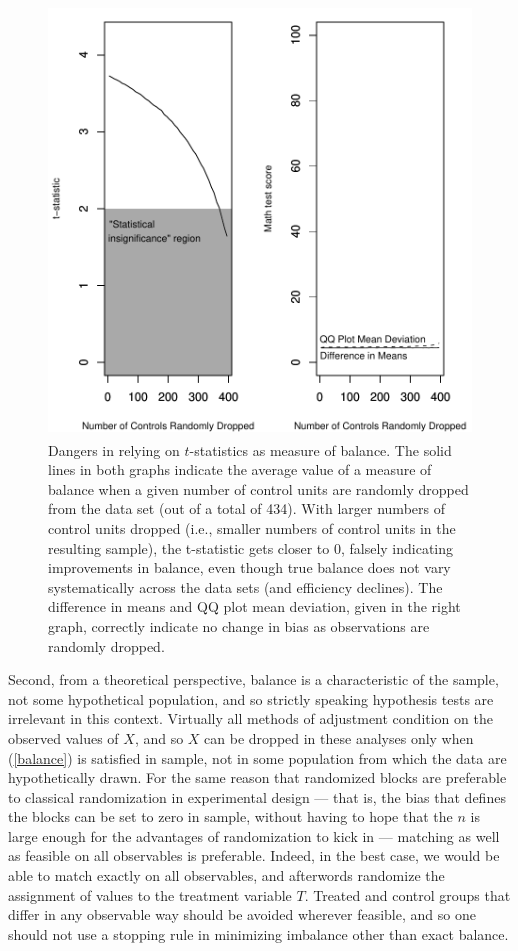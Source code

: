 \documentclass[11pt,titlepage]{article}
\begin{document}
\begin{figure}[t]
  \centering
  \includegraphics[height=4.5in]{figs/TStatPlotR0MATH}
  \caption{Dangers in relying on $t$-statistics as measure of balance.
    The solid lines in both graphs indicate the average value of a
    measure of balance when a given number of control units are
    randomly dropped from the data set (out of a total of 434).  With
    larger numbers of control units dropped (i.e., smaller numbers of
    control units in the resulting sample), the t-statistic gets
    closer to 0, falsely indicating improvements in balance, even
    though true balance does not vary systematically across the data
    sets (and efficiency declines).  The difference in means and QQ
    plot mean deviation, given in the right graph, correctly indicate
    no change in bias as observations are randomly dropped.}
  \label{f:randrop}
\end{figure}

Second, from a theoretical perspective, balance is a characteristic of
the sample, not some hypothetical population, and so strictly speaking
hypothesis tests are irrelevant in this context.  Virtually all
methods of adjustment condition on the observed values of $X$, and so
$X$ can be dropped in these analyses only when (\ref{balance}) is
satisfied in sample, not in some population from which the data are
hypothetically drawn.  For the same reason that randomized blocks are
preferable to classical randomization in experimental design --- that
is, the bias that defines the blocks can be set to zero in sample,
without having to hope that the $n$ is large enough for the advantages
of randomization to kick in --- matching as well as feasible on all
observables is preferable.  Indeed, in the best case, we would be able
to match exactly on all observables, and afterwords randomize the
assignment of values to the treatment variable $T$.  Treated and
control groups that differ in any observable way should be avoided
wherever feasible, and so one should not use a stopping rule in
minimizing imbalance other than exact balance.
\end{document}
